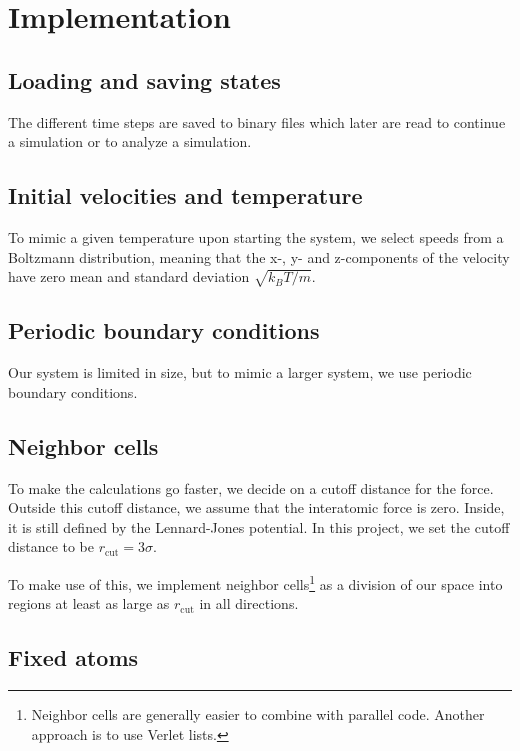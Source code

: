 \documentclass[reprint,floatfix,amsmath,amssymb,aps,pra]{revtex4-1}
\begin{document}
\section{Implementation}

\subsection{Loading and saving states}

The different time steps are saved to binary files which later are read to continue a simulation or to analyze a simulation.

\subsection{Initial velocities and temperature}

To mimic a given temperature upon starting the system, we select speeds from a Boltzmann distribution, meaning that the x-, y- and z-components of the velocity have zero mean and standard deviation $\sqrt{k_{B}T / m}$.

\subsection{Periodic boundary conditions}

Our system is limited in size, but to mimic a larger system, we use periodic boundary conditions. 

\subsection{Neighbor cells}

To make the calculations go faster, we decide on a cutoff distance for the force. Outside this cutoff distance, we assume that the interatomic force is zero. Inside, it is still defined by the Lennard-Jones potential. In this project, we set the cutoff distance to be $r_{\text{cut}} = 3 \sigma$.

To make use of this, we implement neighbor cells\footnote{Neighbor cells are generally easier to combine with parallel code. Another approach is to use Verlet lists.} as a division of our space into regions at least as large as $r_{\text{cut}}$ in all directions.

\subsection{Fixed atoms}
\end{document}
